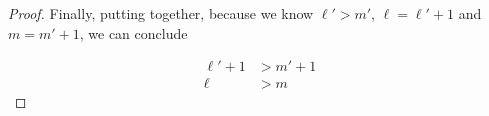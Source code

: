\documentclass[12pt]{article}
\begin{document}
\begin{itemize}
\begin{proof}
    \bigskip

    Finally, putting together, because we know $\ell' > m'$, $\ell = \ell' + 1$
    and $m = m' + 1$, we can conclude

    \begin{align}
        \ell' + 1 &> m' + 1\\
        \ell &> m
    \end{align}


    \end{proof}



















\end{itemize}
\end{document}
